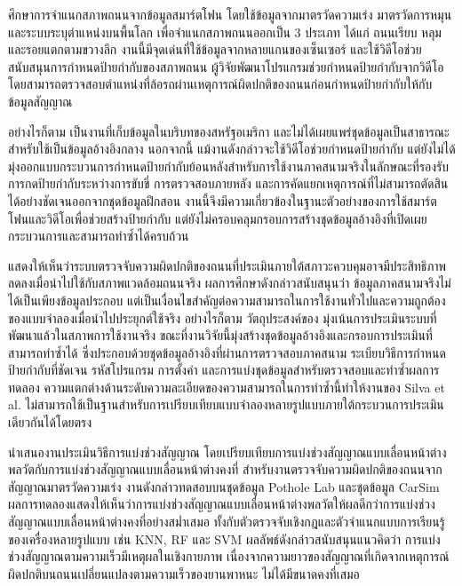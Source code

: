 \textcite{basavaraju2020} ศึกษาการจำแนกสภาพถนนจากข้อมูลสมาร์ตโฟน โดยใช้ข้อมูลจากมาตรวัดความเร่ง มาตรวัดการหมุน และระบบระบุตำแหน่งบนพื้นโลก เพื่อจำแนกสภาพถนนออกเป็น 3 ประเภท ได้แก่ ถนนเรียบ หลุม และรอยแตกตามขวางลึก งานนี้มีจุดเด่นที่ใช้ข้อมูลจากหลายแกนของเซ็นเซอร์ และใช้วิดีโอช่วยสนับสนุนการกำหนดป้ายกำกับของสภาพถนน ผู้วิจัยพัฒนาโปรแกรมช่วยกำหนดป้ายกำกับจากวิดีโอ โดยสามารถตรวจสอบตำแหน่งที่ล้อรถผ่านเหตุการณ์ผิดปกติของถนนก่อนกำหนดป้ายกำกับให้กับข้อมูลสัญญาณ

อย่างไรก็ตาม \textcite{basavaraju2020} เป็นงานที่เก็บข้อมูลในบริบทของสหรัฐอเมริกา และไม่ได้เผยแพร่ชุดข้อมูลเป็นสาธารณะสำหรับใช้เป็นข้อมูลอ้างอิงกลาง นอกจากนี้ แม้งานดังกล่าวจะใช้วิดีโอช่วยกำหนดป้ายกำกับ แต่ยังไม่ได้มุ่งออกแบบกระบวนการกำหนดป้ายกำกับย้อนหลังสำหรับการใช้งานภาคสนามจริงในลักษณะที่รองรับการกดป้ายกำกับระหว่างการขับขี่ การตรวจสอบภายหลัง และการคัดแยกเหตุการณ์ที่ไม่สามารถตัดสินได้อย่างชัดเจนออกจากชุดข้อมูลฝึกสอน งานนี้จึงมีความเกี่ยวข้องในฐานะตัวอย่างของการใช้สมาร์ตโฟนและวิดีโอเพื่อช่วยสร้างป้ายกำกับ แต่ยังไม่ครอบคลุมกรอบการสร้างชุดข้อมูลอ้างอิงที่เปิดเผยกระบวนการและสามารถทำซ้ำได้ครบถ้วน

\textcite{silva2018} แสดงให้เห็นว่าระบบตรวจจับความผิดปกติของถนนที่ประเมินภายใต้สภาวะควบคุมอาจมีประสิทธิภาพลดลงเมื่อนำไปใช้กับสภาพแวดล้อมถนนจริง ผลการศึกษาดังกล่าวสนับสนุนว่า ข้อมูลภาคสนามจริงไม่ได้เป็นเพียงข้อมูลประกอบ แต่เป็นเงื่อนไขสำคัญต่อความสามารถในการใช้งานทั่วไปและความถูกต้องของแบบจำลองเมื่อนำไปประยุกต์ใช้จริง อย่างไรก็ตาม วัตถุประสงค์ของ \textcite{silva2018} มุ่งเน้นการประเมินระบบที่พัฒนาแล้วในสภาพการใช้งานจริง ขณะที่งานวิจัยนี้มุ่งสร้างชุดข้อมูลอ้างอิงและกรอบการประเมินที่สามารถทำซ้ำได้ ซึ่งประกอบด้วยชุดข้อมูลอ้างอิงที่ผ่านการตรวจสอบภาคสนาม ระเบียบวิธีการกำหนดป้ายกำกับที่ชัดเจน รหัสโปรแกรม การตั้งค่า และการแบ่งชุดข้อมูลสำหรับตรวจสอบและทำซ้ำผลการทดลอง ความแตกต่างด้านระดับความละเอียดของความสามารถในการทำซ้ำนี้ทำให้งานของ Silva et al. ไม่สามารถใช้เป็นฐานสำหรับการเปรียบเทียบแบบจำลองหลายรูปแบบภายใต้กระบวนการประเมินเดียวกันได้โดยตรง

\textcite{chibani2022} นำเสนองานประเมินวิธีการแบ่งช่วงสัญญาณ โดยเปรียบเทียบการแบ่งช่วงสัญญาณแบบเลื่อนหน้าต่างพลวัตกับการแบ่งช่วงสัญญาณแบบเลื่อนหน้าต่างคงที่ สำหรับงานตรวจจับความผิดปกติของถนนจากสัญญาณมาตรวัดความเร่ง งานดังกล่าวทดสอบบนชุดข้อมูล Pothole Lab และชุดข้อมูล CarSim ผลการทดลองแสดงให้เห็นว่าการแบ่งช่วงสัญญาณแบบเลื่อนหน้าต่างพลวัตให้ผลดีกว่าการแบ่งช่วงสัญญาณแบบเลื่อนหน้าต่างคงที่อย่างสม่ำเสมอ ทั้งกับตัวตรวจจับเชิงกฎและตัวจำแนกแบบการเรียนรู้ของเครื่องหลายรูปแบบ เช่น KNN, RF และ SVM ผลลัพธ์ดังกล่าวสนับสนุนแนวคิดว่า การแบ่งช่วงสัญญาณตามความเร็วมีเหตุผลในเชิงกายภาพ เนื่องจากความยาวของสัญญาณที่เกิดจากเหตุการณ์ผิดปกติบนถนนเปลี่ยนแปลงตามความเร็วของยานพาหนะ ไม่ได้มีขนาดคงที่เสมอ

